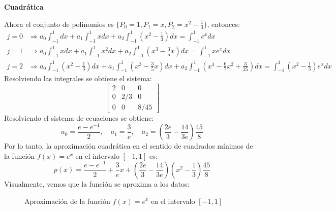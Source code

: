 \documentclass{article}
\begin{document}
\begin{center}
    \textbf{Cuadrática}
\end{center}
Ahora el conjunto de polinomios es $\{ P_0 = 1, P_1 = x, P_2 = x^2 - \frac{1}{3} \}$, entonces:
\begin{align}
    j = 0 &\Rightarrow a_0 \int_{-1}^{1} dx + a_1 \int_{-1}^{1} x dx + a_2 \int_{-1}^{1} (x^2 - \frac{1}{3}) dx = \int_{-1}^{1} e^x dx \\
    j = 1 &\Rightarrow a_0 \int_{-1}^{1} x dx + a_1 \int_{-1}^{1} x^2 dx + a_2 \int_{-1}^{1} (x^3 - \frac{3}{5}x) dx = \int_{-1}^{1} xe^x dx \\
    j = 2 &\Rightarrow a_0 \int_{-1}^{1} (x^2 - \frac{1}{3}) dx + a_1 \int_{-1}^{1} (x^3 - \frac{3}{5}x) dx + a_2 \int_{-1}^{1} (x^4 - \frac{6}{7}x^2 + \frac{3}{25}) dx = \int_{-1}^{1} (x^2 - \frac{1}{3})e^x dx
\end{align}
Resolviendo las integrales se obtiene el sistema:
\begin{equation}
    \begin{bmatrix}
        2 & 0 & 0 \\
        0 & 2/3 & 0 \\
        0 & 0 & 8/45
    \end{bmatrix}
\end{equation}
Resolviendo el sistema de ecuaciones se obtiene:
\begin{equation}
    a_0 = \frac{e - e^{-1}}{2}, \quad a_1 = \frac{3}{e}, \quad a_2 = (\frac{2e}{3} - \frac{14}{3e}) \frac{45}{8}
\end{equation}
Por lo tanto, la aproximación cuadrática en el sentido de cuadrados mínimos de la función \( f(x) = e^x \) en el intervalo \([-1,1]\) es:
\begin{equation}
    p(x) = \frac{e - e^{-1}}{2} + \frac{3}{e}x + \left( \frac{2e}{3} - \frac{14}{3e} \right) \left( x^2 - \frac{1}{3} \right) \frac{45}{8}
\end{equation}
\newpage
Visualmente, vemos que la función se aproxima a los datos:
\begin{figure}[h]
    \centering
    \caption{Aproximación de la función \( f(x) = e^x \) en el intervalo \([-1,1]\)}
    \label{fig:myplot14}
\end{figure}
\newpage
\end{document}
